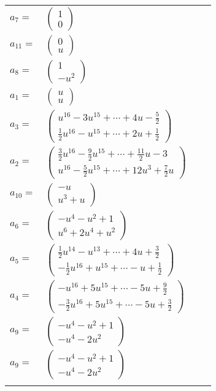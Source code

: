\documentclass[1p]{elsarticle_modified}
\theoremstyle{definition}
\begin{document}
\begin{tabular}{m{7pt} m{180pt} m{7pt} m{180pt} }
\flushright $a_{7}=$&$\begin{pmatrix}1\\0\end{pmatrix}$ \\
\flushright $a_{11}=$&$\begin{pmatrix}0\\u\end{pmatrix}$ \\
\flushright $a_{8}=$&$\begin{pmatrix}1\\- u^2\end{pmatrix}$ \\
\flushright $a_{1}=$&$\begin{pmatrix}u\\u\end{pmatrix}$ \\
\flushright $a_{3}=$&$\begin{pmatrix}u^{16}-3 u^{15}+\cdots+4 u-\frac{5}{2}\\\frac{1}{2} u^{16}- u^{15}+\cdots+2 u+\frac{1}{2}\end{pmatrix}$ \\
\flushright $a_{2}=$&$\begin{pmatrix}\frac{3}{2} u^{16}-\frac{9}{2} u^{15}+\cdots+\frac{11}{2} u-3\\u^{16}-\frac{5}{2} u^{15}+\cdots+12 u^3+\frac{7}{2} u\end{pmatrix}$ \\
\flushright $a_{10}=$&$\begin{pmatrix}- u\\u^3+u\end{pmatrix}$ \\
\flushright $a_{6}=$&$\begin{pmatrix}- u^4- u^2+1\\u^6+2 u^4+u^2\end{pmatrix}$ \\
\flushright $a_{5}=$&$\begin{pmatrix}\frac{1}{2} u^{14}- u^{13}+\cdots+4 u+\frac{3}{2}\\-\frac{1}{2} u^{16}+u^{15}+\cdots- u+\frac{1}{2}\end{pmatrix}$ \\
\flushright $a_{4}=$&$\begin{pmatrix}- u^{16}+5 u^{15}+\cdots-5 u+\frac{9}{2}\\-\frac{3}{2} u^{16}+5 u^{15}+\cdots-5 u+\frac{3}{2}\end{pmatrix}$ \\
\flushright $a_{9}=$&$\begin{pmatrix}- u^4- u^2+1\\- u^4-2 u^2\end{pmatrix}$\\ \flushright $a_{9}=$&$\begin{pmatrix}- u^4- u^2+1\\- u^4-2 u^2\end{pmatrix}$\\&\end{tabular}
\end{document}

